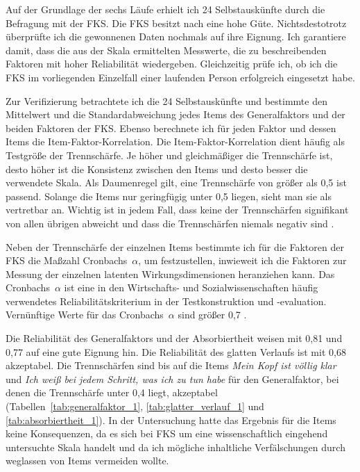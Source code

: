 \label{sub:operationalisierung_und_gewonnene_daten_5_1}

Auf der Grundlage der sechs Läufe erhielt ich 24 Selbstauskünfte durch die Befragung mit der \ac{FKS}. Die \ac{FKS} besitzt nach \citet{Rheinberg2003} eine hohe Güte. Nichtsdestotrotz überprüfte ich die gewonnenen Daten nochmals auf ihre Eignung. Ich garantiere damit, dass die aus der Skala ermittelten Messwerte, die zu beschreibenden Faktoren mit hoher Reliabilität wiedergeben. Gleichzeitig prüfe ich, ob ich die \ac{FKS} im vorliegenden Einzelfall einer laufenden Person erfolgreich eingesetzt habe.

Zur Verifizierung betrachtete ich die 24 Selbstauskünfte und bestimmte den Mittelwert und die Standardabweichung jedes Items des Generalfaktors und der beiden Faktoren der \ac{FKS}. Ebenso berechnete ich für jeden Faktor und dessen Items die Item-Faktor-Korrelation. Die Item-Faktor-Korrelation dient häufig als Testgröße der Trennschärfe. Je höher und gleichmäßiger die Trennschärfe ist, desto höher ist die Konsistenz zwischen den Items und desto besser die verwendete Skala. Als Daumenregel gilt, eine Trennschärfe von größer als 0,5 ist passend. Solange die Items nur geringfügig unter 0,5 liegen, sieht man sie als vertretbar an. Wichtig ist in jedem Fall, dass keine der Trennschärfen signifikant von allen übrigen abweicht und dass die Trennschärfen niemals negativ sind \citep[][S.~219f.]{Bortz2006}.

Neben der Trennschärfe der einzelnen Items bestimmte ich für die Faktoren der \ac{FKS} die Maßzahl Cronbachs~$\alpha$, um festzustellen, inwieweit ich die Faktoren zur Messung der einzelnen latenten Wirkungsdimensionen heranziehen kann. Das Cronbachs~$\alpha$ ist eine in den Wirtschafts- und Sozialwissenschaften häufig verwendetes Reliabilitätskriterium in der Testkonstruktion und -evaluation. Vernünftige Werte für das Cronbachs~$\alpha$ sind größer 0,7 \citep[][S.~189f.]{Bortz2006}.

Die Reliabilität des Generalfaktors und der Absorbiertheit weisen mit 0,81 und 0,77 auf eine gute Eignung hin. Die Reliabilität des glatten Verlaufs ist mit 0,68 akzeptabel. Die Trennschärfen sind bis auf die Items \emph{Mein Kopf ist völlig klar} und \emph{Ich weiß bei jedem Schritt, was ich zu tun habe} für den Generalfaktor, bei denen die Trennschärfe unter 0,4 liegt, akzeptabel (Tabellen~\ref{tab:generalfaktor_1}, \ref{tab:glatter_verlauf_1} und \ref{tab:absorbiertheit_1}). In der Untersuchung hatte das Ergebnis für die Items keine Konsequenzen, da es sich bei \ac{FKS} um eine wissenschaftlich eingehend untersuchte Skala handelt und da ich mögliche inhaltliche Verfälschungen durch weglassen von Items vermeiden wollte.


